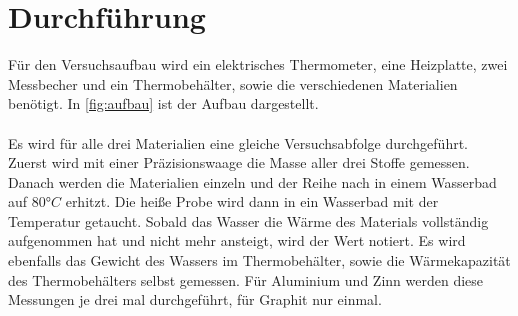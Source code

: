 \section{Durchführung}
\label{sec:Durchführung}

Für den Versuchsaufbau wird ein elektrisches Thermometer, eine Heizplatte, zwei Messbecher und ein Thermobehälter, sowie die verschiedenen Materialien benötigt.
In \autoref{fig:aufbau} ist der Aufbau dargestellt.
\\
\
\\
Es wird für alle drei Materialien eine gleiche Versuchsabfolge durchgeführt.\\
Zuerst wird mit einer Präzisionswaage die Masse aller drei Stoffe gemessen.
Danach werden die Materialien einzeln und der Reihe nach in einem Wasserbad auf $80°C$ erhitzt.
Die heiße Probe wird dann in ein Wasserbad mit der Temperatur getaucht.
Sobald das Wasser die Wärme des Materials vollständig aufgenommen hat und nicht mehr ansteigt, wird der Wert notiert.
Es wird ebenfalls das Gewicht des Wassers im Thermobehälter, sowie die Wärmekapazität des Thermobehälters selbst gemessen.
Für Aluminium und Zinn werden diese Messungen je drei mal durchgeführt, für Graphit nur einmal.